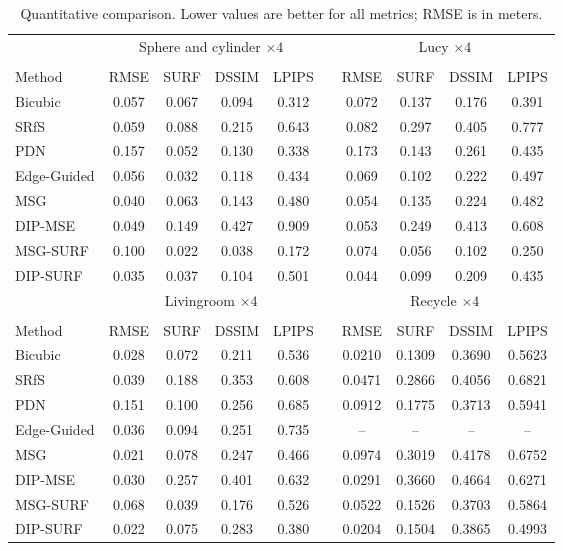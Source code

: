 

\begin{table}[t]
\centering
\begin{tabular}{lccccccccc}
\toprule
 & \multicolumn{4}{c}{Sphere and cylinder $\times 4$} && \multicolumn{4}{c}{Lucy $\times 4$}\\
        \cmidrule{2-5} \cmidrule{7-10}\\
Method          & RMSE & SURF & DSSIM & LPIPS && RMSE & SURF & DSSIM & LPIPS \\
\midrule
Bicubic & 0.057 & 0.067 & 0.094 & 0.312     && 0.072 & 0.137 & 0.176 & 0.391 \\
SRfS & 0.059 & 0.088 & 0.215 & 0.643        && 0.082 & 0.297 & 0.405 & 0.777 \\
PDN & 0.157 & 0.052 & 0.130 & 0.338         && 0.173 & 0.143 & 0.261 & 0.435 \\
Edge-Guided & 0.056 & 0.032 & 0.118 & 0.434 && 0.069 & 0.102 & 0.222 & 0.497 \\
MSG & 0.040 & 0.063 & 0.143 & 0.480         && 0.054 & 0.135 & 0.224 & 0.482 \\
DIP-MSE & 0.049 & 0.149 & 0.427 & 0.909  && 0.053 & 0.249 & 0.413 & 0.608 \\
MSG-SURF & 0.100 & 0.022 & 0.038 & 0.172   && 0.074 & 0.056 & 0.102 & 0.250 \\
DIP-SURF & 0.035 & 0.037 & 0.104 & 0.501      && 0.044 & 0.099 & 0.209 & 0.435  \\
\midrule
 & \multicolumn{4}{c}{Livingroom $\times 4$} && \multicolumn{4}{c}{Recycle $\times 4$} \\
        \cmidrule{2-5} \cmidrule{7-10}\\
Method & RMSE & SURF & DSSIM & LPIPS     && RMSE & SURF & DSSIM & LPIPS \\
\midrule
Bicubic & 0.028 & 0.072 & 0.211 & 0.536     && 0.0210 & 0.1309   &   0.3690    &   0.5623 \\
SRfS & 0.039 & 0.188 & 0.353 & 0.608        && 0.0471 & 0.2866   &   0.4056    &   0.6821 \\
PDN & 0.151 & 0.100 & 0.256 & 0.685         && 0.0912 & 0.1775   &   0.3713    &   0.5941 \\
Edge-Guided & 0.036 & 0.094 & 0.251 & 0.735 &&  --    &  --      &    --       &    -- \\
MSG & 0.021 & 0.078 & 0.247 & 0.466         && 0.0974 & 0.3019   &   0.4178    &   0.6752 \\
DIP-MSE & 0.030 & 0.257 & 0.401 & 0.632  && 0.0291 & 0.3660   &   0.4664    &   0.6271 \\
MSG-SURF & 0.068 & 0.039 & 0.176 & 0.526   && 0.0522 & 0.1526   &   0.3703    &   0.5864 \\
DIP-SURF & 0.022 & 0.075 & 0.283 & 0.380      && 0.0204 & 0.1504   &   0.3865    &   0.4993 \\
\bottomrule
\end{tabular}
\caption{Quantitative comparison. Lower values are better for all metrics; RMSE is in meters.}
\label{tab:results}
\vspace{-3pt}
\end{table}




